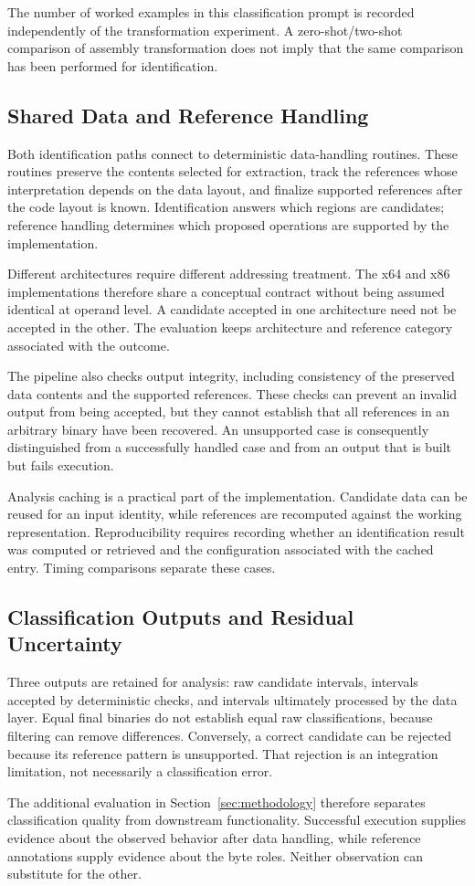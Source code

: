 The number of worked examples in this classification prompt is recorded
independently of the transformation experiment. A zero-shot/two-shot
comparison of assembly transformation does not imply that the same
comparison has been performed for identification.

\subsection{Shared Data and Reference Handling}
Both identification paths connect to deterministic data-handling
routines. These routines preserve the contents selected for extraction,
track the references whose interpretation depends on the data layout,
and finalize supported references after the code layout is known.
Identification answers which regions are candidates; reference handling
determines which proposed operations are supported by the implementation.

Different architectures require different addressing treatment. The
x64 and x86 implementations therefore share a conceptual contract
without being assumed identical at operand level. A candidate accepted
in one architecture need not be accepted in the other. The evaluation
keeps architecture and reference category associated with the outcome.

The pipeline also checks output integrity, including consistency of
the preserved data contents and the supported references. These checks
can prevent an invalid output from being accepted, but they cannot
establish that all references in an arbitrary binary have been recovered.
An unsupported case is consequently distinguished from a successfully
handled case and from an output that is built but fails execution.

Analysis caching is a practical part of the implementation. Candidate
data can be reused for an input identity, while references are recomputed
against the working representation. Reproducibility requires recording
whether an identification result was computed or retrieved and the
configuration associated with the cached entry. Timing comparisons
separate these cases.

\subsection{Classification Outputs and Residual Uncertainty}
Three outputs are retained for analysis: raw candidate intervals,
intervals accepted by deterministic checks, and intervals ultimately
processed by the data layer. Equal final binaries do not establish
equal raw classifications, because filtering can remove differences.
Conversely, a correct candidate can be rejected because its reference
pattern is unsupported. That rejection is an integration limitation,
not necessarily a classification error.

The additional evaluation in Section~\ref{sec:methodology} therefore separates
classification quality from downstream functionality. Successful
execution supplies evidence about the observed behavior after data
handling, while reference annotations supply evidence about the byte
roles. Neither observation can substitute for the other.
